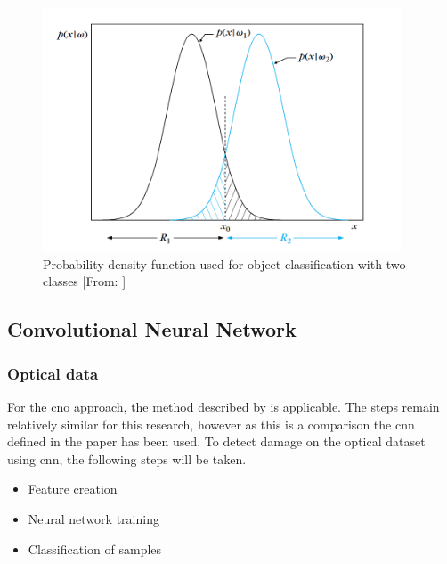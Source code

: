 \begin{figure}[!h]
	\centering
	\captionsetup{justification=raggedright,singlelinecheck=false}
	\includegraphics[width=0.95\textwidth]{figs/pdf.png}
	\caption{\footnotesize{Probability density function used for object classification with two classes [From: \cite{Theodoridis2009}}]}
	\label{fig:pdf}
\end{figure}

\subsection{Convolutional Neural Network} \label{sec:Mvet}
\subsubsection*{Optical data} 
For the \ac{cno} approach, the method described by \citet{Vetrivel2016b} is applicable. The steps remain relatively similar for this research, however as this is a comparison the \ac{cnn} defined in the paper has been used. To detect damage on the optical dataset using \ac{cnn}, the following steps will be taken.
\begin{itemize}
	\item Feature creation
	\item Neural network training
	\item Classification of samples\\
\end{itemize} 


